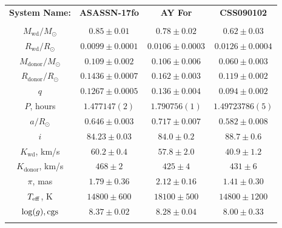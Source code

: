 \begin{table}
\begin{tabular}{cccc}
        \hline
        \hline \\[2em]
        \hline
        \textbf{System Name:}      & \textbf{ASASSN-17fo}      & \textbf{AY For}        & \textbf{CSS090102}     \\
        \hline \hline \\
        $M_\mathrm{wd}/M_\odot$    & $0.85\pm0.01$             & $0.78\pm0.02$          & $0.62\pm0.03$          \\
        $R_\mathrm{wd}/R_\odot$    & $0.0099\pm0.0001$         & $0.0106\pm0.0003$      & $0.0126\pm0.0004$      \\
        $M_\mathrm{donor}/M_\odot$ & $0.109\pm0.002$           & $0.106\pm0.006$        & $0.060\pm0.003$        \\
        $R_\mathrm{donor}/R_\odot$ & $0.1436\pm0.0007$         & $0.162\pm0.003$        & $0.119\pm0.002$        \\
        $q$                        & $0.1267\pm0.0005$         & $0.136\pm0.004$        & $0.094\pm0.002$        \\
        \hline
        $P$, hours                 & $1.477147(2)$             & $1.790756(1)$          & $1.49723786(5)$        \\
        $a/R_\odot$                & $0.646\pm0.003$           & $0.717\pm0.007$        & $0.582\pm0.008$        \\
        $i$                        & $84.23\pm0.03$            & $84.0\pm0.2$           & $88.7\pm0.6$           \\
        $K_\mathrm{wd}$, km/s      & $60.2\pm0.4$              & $57.8\pm2.0$           & $40.9\pm1.2$           \\
        $K_\mathrm{donor}$, km/s   & $468\pm2$                 & $425\pm4$              & $431\pm6$              \\
        \hline
        $\pi$, mas                 & $1.79\pm0.36$             & $2.12\pm0.16$          & $1.41\pm0.30$          \\
        $T_{\rm eff}$, K           & $14800\pm600$             & $18100\pm500$          & $14800\pm1200$         \\
        $\log(g), {\rm cgs}$       & $8.37\pm0.02$             & $8.28\pm0.04$          & $8.00\pm0.33$          \\
        \hline
        \hline \\[2em]
    \end{tabular}
\end{table}

